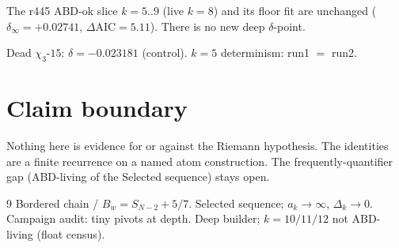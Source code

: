 \documentclass[11pt]{article}
\begin{document}
The r445 ABD-ok slice $k=5..9$ (live $k=8$)
and its floor fit are unchanged
($\delta_\infty=+0.02741$, $\Delta\mathrm{AIC}=5.11$).
There is no new deep $\delta$-point.

Dead $\chi_3$-$15$: $\delta=-0.023181$ (control).
$k=5$ determinism: run1 $=$ run2.

\section*{Claim boundary}

Nothing here is evidence for or against the Riemann
hypothesis.
The identities are a finite recurrence on a
named atom construction.
The frequently-quantifier gap (ABD-living of
the Selected sequence) stays open.

\begin{thebibliography}{9}
 Bordered chain / $B_w=S_{N-2}+5/7$.
 Selected sequence; $a_k\to\infty$, $\Delta_k\to 0$.
 Campaign audit: tiny pivots at depth.
 Deep builder; $k=10/11/12$ not ABD-living
(float census).
\end{thebibliography}
\end{document}
